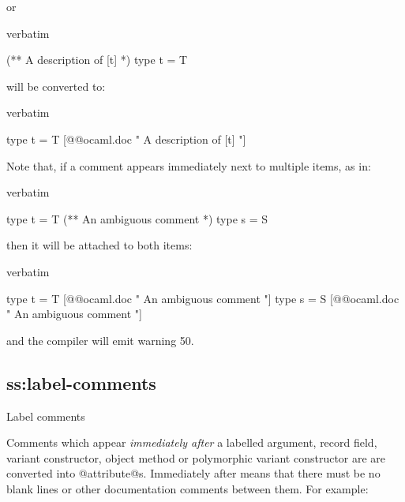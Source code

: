 {or

\begin{camlexample}{verbatim}
\begin{caml}
\begin{camlinput}
(** A description of [t] *)
type t = T
\end{camlinput}
\end{caml}
\end{camlexample}

will be converted to:

\begin{camlexample}{verbatim}
\begin{caml}
\begin{camlinput}
type t = T
[@@ocaml.doc " A description of [t] "]
\end{camlinput}
\end{caml}
\end{camlexample}

Note that, if a comment appears immediately next to multiple items,
as in:

\begin{camlexample}{verbatim}
\begin{caml}
\begin{camlinput}
type t = T
(** An ambiguous comment *)
type s = S
\end{camlinput}
\end{caml}
\end{camlexample}

then it will be attached to both items:

\begin{camlexample}{verbatim}
\begin{caml}
\begin{camlinput}
type t = T
[@@ocaml.doc " An ambiguous comment "]
type s = S
[@@ocaml.doc " An ambiguous comment "]
\end{camlinput}
\end{caml}
\end{camlexample}

and the compiler will emit warning 50.

\subsection{ss:label-comments}{Label comments}

Comments which appear {\em immediately after} a labelled argument,
record field, variant constructor, object method or polymorphic variant
constructor are are converted into @attribute@s. Immediately
after means that there must be no blank lines or other documentation
comments between them. For example:

}
